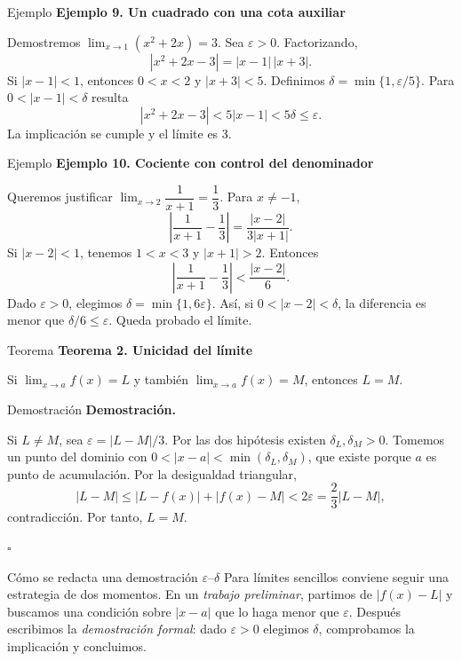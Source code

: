 \documentclass[12pt,aspectratio=169]{beamer}
\begin{document}
\begin{frame}[t,allowframebreaks]{Ejemplo}
{\color{azul}\bfseries Ejemplo 9. Un cuadrado con una cota auxiliar}\par\medskip

Demostremos $\lim_{x\to1}(x^2+2x)=3$. Sea $\varepsilon>0$. Factorizando,
\[
 |x^2+2x-3|=|x-1|\,|x+3|.
\]
Si $|x-1|<1$, entonces $0<x<2$ y $|x+3|<5$. Definimos $\delta=\min\{1,\varepsilon/5\}$. Para $0<|x-1|<\delta$ resulta
\[
 |x^2+2x-3|<5|x-1|<5\delta\le\varepsilon.
\]
La implicación se cumple y el límite es $3$.
\end{frame}


\begin{frame}[t,allowframebreaks]{Ejemplo}
{\color{azul}\bfseries Ejemplo 10. Cociente con control del denominador}\par\medskip

Queremos justificar $\lim_{x\to2}\dfrac1{x+1}=\dfrac13$. Para $x\ne-1$,
\[
 \left|\frac1{x+1}-\frac13\right|=\frac{|x-2|}{3|x+1|}.
\]
Si $|x-2|<1$, tenemos $1<x<3$ y $|x+1|>2$. Entonces
\[
 \left|\frac1{x+1}-\frac13\right|<\frac{|x-2|}{6}.
\]
Dado $\varepsilon>0$, elegimos $\delta=\min\{1,6\varepsilon\}$. Así, si $0<|x-2|<\delta$, la diferencia es menor que $\delta/6\le\varepsilon$. Queda probado el límite.
\end{frame}


\begin{frame}[t,allowframebreaks]{Teorema}
{\color{azul}\bfseries Teorema 2. Unicidad del límite}\par\medskip

Si $\lim_{x\to a}f(x)=L$ y también $\lim_{x\to a}f(x)=M$, entonces $L=M$.
\end{frame}


\begin{frame}[t,allowframebreaks]{Demostración}
{\color{azul}\bfseries Demostración.}\par\smallskip

Si $L\ne M$, sea $\varepsilon=|L-M|/3$. Por las dos hipótesis existen $\delta_L,\delta_M>0$. Tomemos un punto del dominio con $0<|x-a|<\min(\delta_L,\delta_M)$, que existe porque $a$ es punto de acumulación. Por la desigualdad triangular,
\[
 |L-M|\le|L-f(x)|+|f(x)-M|<2\varepsilon=\frac23|L-M|,
\]
contradicción. Por tanto, $L=M$.

\hfill $\square$
\end{frame}


\begin{frame}[t,allowframebreaks]{Cómo se redacta una demostración $\varepsilon$--$\delta$}
Para límites sencillos conviene seguir una estrategia de dos momentos. En un \emph{trabajo preliminar}, partimos de $|f(x)-L|$ y buscamos una condición sobre $|x-a|$ que lo haga menor que $\varepsilon$. Después escribimos la \emph{demostración formal}: dado $\varepsilon>0$ elegimos $\delta$, comprobamos la implicación y concluimos.
\end{frame}
\end{document}
